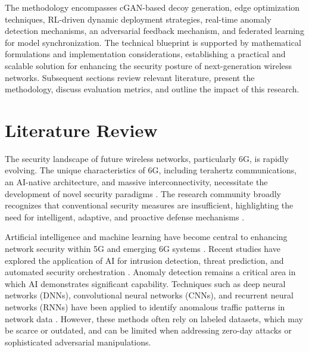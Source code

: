\documentclass{article}
\begin{document}
The methodology encompasses cGAN-based decoy generation, edge optimization techniques, RL-driven dynamic deployment strategies, real-time anomaly detection mechanisms, an adversarial feedback mechanism, and federated learning for model synchronization. The technical blueprint is supported by mathematical formulations and implementation considerations, establishing a practical and scalable solution for enhancing the security posture of next-generation wireless networks. Subsequent sections review relevant literature, present the methodology, discuss evaluation metrics, and outline the impact of this research.

\section{Literature Review}

The security landscape of future wireless networks, particularly 6G, is rapidly evolving. The unique characteristics of 6G, including terahertz communications, an AI-native architecture, and massive interconnectivity, necessitate the development of novel security paradigms \cite{Nguyen2021SecurityAPN, Hussein2022SecurityRAAA, Li2024TheSAR, Abuadbba2024From5TAM, Salas2024SecurityTAAN}. The research community broadly recognizes that conventional security measures are insufficient, highlighting the need for intelligent, adaptive, and proactive defense mechanisms \cite{Siriwardhana2021AIA6W, Janay2023SecureDTAO, Rahman2021NetworkAPAQ}.

Artificial intelligence and machine learning have become central to enhancing network security within 5G and emerging 6G systems \cite{Haider2020ArtificialIAT, Li2025EvolvingTAL}. Recent studies have explored the application of AI for intrusion detection, threat prediction, and automated security orchestration \cite{Cifuentes2024AnalysisOTE, Gkonis2024LeveragingNDAF, Rodrguez2024ASSQ, Yang2023TowardsACK}. Anomaly detection remains a critical area in which AI demonstrates significant capability. Techniques such as deep neural networks (DNNs), convolutional neural networks (CNNs), and recurrent neural networks (RNNs) have been applied to identify anomalous traffic patterns in network data \cite{Saeed2023AnomalyDIY, Rzym2024DynamicTAAB, Solanki2024EnhancedADAL, Cao2024TheDOH, Paolini2023RealTimeCBP, Nomikos2025ADTAI}. However, these methods often rely on labeled datasets, which may be scarce or outdated, and can be limited when addressing zero-day attacks or sophisticated adversarial manipulations.
\end{document}
